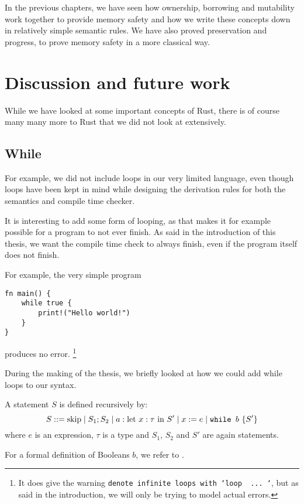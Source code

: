 In the previous chapters, we have seen how ownership, borrowing and mutability work together to provide memory safety and how we write these concepts down in relatively simple semantic rules. We have also proved preservation and progress, to prove memory safety in a more classical way. 

\section{Discussion and future work}
While we have looked at some important concepts of Rust, there is of course many many more to Rust that we did not look at extensively. 

\subsection{While}
For example, we did not include loops in our very limited language, even though loops have been kept in mind while designing the derivation rules for both the semantics and compile time checker. 

It is interesting to add some form of looping, as that makes it for example possible for a program to not ever finish. As said in the introduction of this thesis, we want the compile time check to always finish, even if the program itself does not finish. 

For example, the very simple program 

\begin{verbatim}
fn main() {
    while true {
        print!("Hello world!")
    }
}
\end{verbatim}

produces no error. \footnote{It does give the warning \texttt{denote infinite loops with `loop { ... }`}, but as said in the introduction, we will only be trying to model actual errors.}

During the making of the thesis, we briefly looked at how we could add while loops to our syntax. 

\begin{definition}
\label{statementswhile}
A statement $S$ is defined recursively by:
$$S ::= \textrm{skip} \mid S_1; S_2 \mid a: \textrm{let } x:\tau \textrm{ in } S' \mid x := e \mid \texttt{while } b~ \{ S' \}$$
where $e$ is an expression, $\tau$ is a type and $S_1$, $S_2$ and $S'$ are again statements.
\end{definition}

For a formal definition of Booleans $b$, we refer to \cite{nielson1992semantics}.

